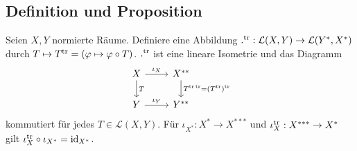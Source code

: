 \subsection{Definition und Proposition} %
\label{sub:34}
Seien $X,Y$ normierte Räume. Definiere eine Abbildung $.^{\mathrm{tr}} : \mathcal{L}(X,Y) \to \mathcal{L}(Y^*,X^*)$ durch $T \mapsto T^{\mathrm{tr}} = (\varphi \mapsto \varphi \circ T)$.
$.^{\mathrm{tr}}$ ist eine lineare Isometrie und das Diagramm
\[
	\begin{tikzcd}
		X \rar["\iota_X"] \dar["T"]& X^{**} \dar["T^{\tr \, \tr}= (T^\tr)^\tr"]\\
		Y \rar["\iota_Y"]& Y^{**}
	\end{tikzcd}
\]
kommutiert für jedes $T \in \mathcal{L}(X,Y)$. Für $\iota_{X^*} : X^* \to X^{***}$ und $\iota_{X}^{\mathrm{tr}} : X^{***} \to X^*$ gilt $\iota_X^{\mathrm{tr}} \circ \iota_{X^*} = \operatorname{id}_{X^*}$.
